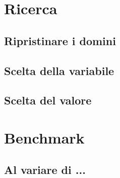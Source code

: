 \documentclass[a4paper,12pt,italian]{article}
\begin{document}
\section{Ricerca}
\subsection{Ripristinare i domini}
\subsection{Scelta della variabile}
\subsection{Scelta del valore}

\section{Benchmark}

\subsection{Al variare di ...}
\end{document}
